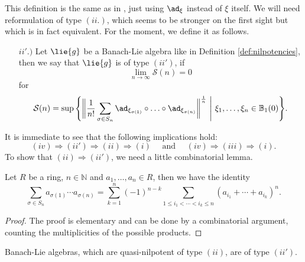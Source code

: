 \documentclass[
11pt,                          %
english                        %
]{article}
\begin{document}
This definition is the same as in \cite{mueller:1994a}, just using $\ad_\xi$ 
instead of $\xi$ itself. We will need reformulation of type $(ii.)$, which seems to 
be stronger on the first sight but which is in fact equivalent. For the moment, we 
define it as follows.
\begin{itemize}
	\item[$ii'.)$]
	Let $\lie{g}$ be a Banach-Lie algebra like in Definition 
	\ref{def:nilpotencies}, then we say that $\lie{g}$ is of type $(ii')$, if
	\begin{equation*}
		\lim_{n \longrightarrow \infty}
		\mathcal{S}(n)
		=
		0
	\end{equation*}
	for
	\begin{equation}
		\mathcal{S}(n)
		=
		\sup \Bigg\{ 
			\bigg\Vert
				\frac{1}{n!}
				\sum\limits_{\sigma \in S_n}
				\ad_{\xi_{\sigma(1)}} \circ \ldots \circ \ad_{\xi_{\sigma(n)}}
			\bigg\Vert^{\frac{1}{n}} 
		\ \Bigg| \ 
			\xi_1, \ldots, \xi_n \in \mathbb{B}_1(0)
		\Bigg\}.
	\end{equation}
\end{itemize}
It is immediate to see that the following implications hold:
\begin{equation*}
	(iv) \Longrightarrow 
	(ii') \Longrightarrow 
	(ii) \Longrightarrow 
	(i)
	\quad \text{ and } \quad
	(iv) \Longrightarrow
	(iii) \Longrightarrow 
	(i).
\end{equation*}
To show that $(ii) \Longrightarrow (ii')$, we need a little combinatorial lemma.
\begin{lemma}
	\label{lemma:symmetric-to-power}
	Let $R$ be a ring, $n\in \mathbb{N}$ and $a_1, 
	\ldots, a_n \in R$, then we have the identity
	\begin{equation*}
		\sum\limits_{\sigma \in S_n}
		a_{\sigma(1)} \cdots a_{\sigma(n)}
		=
		\sum\limits_{k = 1}^n
		(-1)^{n-k}
		\sum\limits_{1 \leq i_1 < \cdots < i_k \leq n}
		(a_{i_1} + \cdots + a_{i_k})^n.
	\end{equation*}
\end{lemma}
\begin{proof}
	The proof is elementary and can be done by a combinatorial argument, counting 
	the multiplicities of the possible products.
\end{proof}
\begin{proposition}
	\label{prop:type-2-is-2prime}
	Banach-Lie algebras, which are quasi-nilpotent of type $(ii)$, are of type 
	$(ii')$.
\end{proposition}
\end{document}
